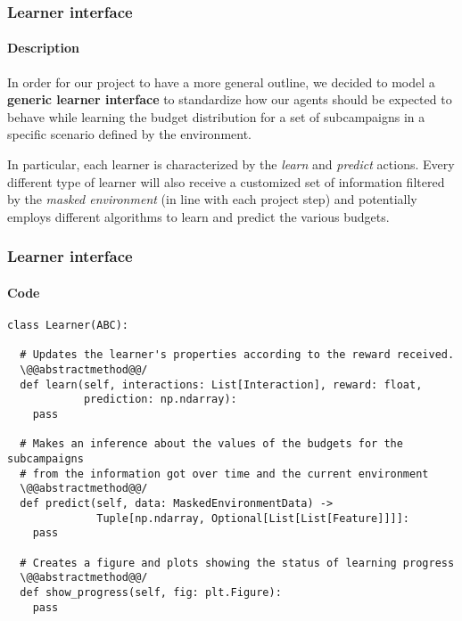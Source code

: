 
\begin{frame}

\frametitle{Learner interface}
\framesubtitle{Description}

In order for our project to have a more general outline, we decided to model a \textbf{generic learner interface} to standardize how our agents should be expected to behave while learning the budget distribution for a set of subcampaigns in a specific scenario defined by the environment.

In particular, each learner is characterized by the \textit{learn} and \textit{predict} actions.
Every different type of learner will also receive a customized set of information filtered by the \textit{masked environment} (in line with each project step) and potentially employs different algorithms to learn and predict the various budgets.

\end{frame}


\begin{frame}[fragile]

\frametitle{Learner interface}
\framesubtitle{Code}

%

\begin{lstlisting}[style=Python, basicstyle=\tiny, numbers=none, framexrightmargin=-20pt]
class Learner(ABC):

  # Updates the learner's properties according to the reward received.
  \@@abstractmethod@@/
  def learn(self, interactions: List[Interaction], reward: float,
            prediction: np.ndarray):
    pass

  # Makes an inference about the values of the budgets for the subcampaigns
  # from the information got over time and the current environment
  \@@abstractmethod@@/
  def predict(self, data: MaskedEnvironmentData) ->
              Tuple[np.ndarray, Optional[List[List[Feature]]]]:
    pass

  # Creates a figure and plots showing the status of learning progress
  \@@abstractmethod@@/
  def show_progress(self, fig: plt.Figure):
    pass

\end{lstlisting}

\end{frame}


